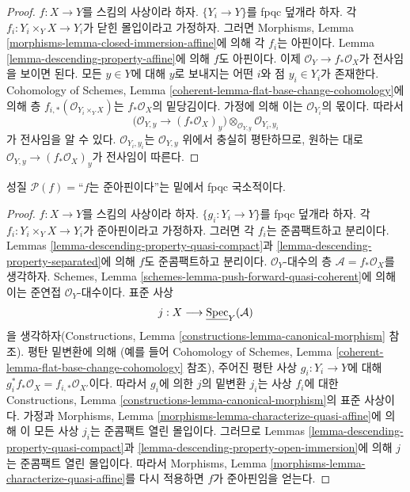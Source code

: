 \begin{proof}
$f : X \to Y$를 스킴의 사상이라 하자. $\{Y_i \to Y\}$를 fpqc
덮개라 하자. 각 $f_i : Y_i \times_Y X \to Y_i$가 닫힌 몰입이라고
가정하자. 그러면 Morphisms, Lemma
\ref{morphisms-lemma-closed-immersion-affine}에 의해 각 $f_i$는 아핀이다.
Lemma \ref{lemma-descending-property-affine}에 의해 $f$도 아핀이다. 이제
$\mathcal{O}_Y \to f_*\mathcal{O}_X$가 전사임을 보이면 된다. 모든
$y \in Y$에 대해 $y$로 보내지는 어떤 $i$와 점 $y_i \in Y_i$가 존재한다.
Cohomology of Schemes, Lemma
\ref{coherent-lemma-flat-base-change-cohomology}에 의해 층
$f_{i, *}(\mathcal{O}_{Y_i \times_Y X})$는 $f_*\mathcal{O}_X$의
밑당김이다. 가정에 의해 이는 $\mathcal{O}_{Y_i}$의 몫이다. 따라서
$$
\Big(
\mathcal{O}_{Y, y} \longrightarrow (f_*\mathcal{O}_X)_y
\Big)
\otimes_{\mathcal{O}_{Y, y}} \mathcal{O}_{Y_i, y_i}
$$
가 전사임을 알 수 있다. $\mathcal{O}_{Y_i, y_i}$는
$\mathcal{O}_{Y, y}$ 위에서 충실히 평탄하므로, 원하는 대로
$\mathcal{O}_{Y, y} \longrightarrow (f_*\mathcal{O}_X)_y$가 전사임이
따른다.
\end{proof}

\begin{lemma}
\label{lemma-descending-property-quasi-affine}
성질 $\mathcal{P}(f) =$“$f$는 준아핀이다”는 밑에서 fpqc 국소적이다.
\end{lemma}

\begin{proof}
$f : X \to Y$를 스킴의 사상이라 하자. $\{g_i : Y_i \to Y\}$를 fpqc
덮개라 하자. 각 $f_i : Y_i \times_Y X \to Y_i$가 준아핀이라고
가정하자. 그러면 각 $f_i$는 준콤팩트하고 분리이다. Lemmas
\ref{lemma-descending-property-quasi-compact}과
\ref{lemma-descending-property-separated}에 의해 $f$도 준콤팩트하고
분리이다. $\mathcal{O}_Y$-대수의 층
$\mathcal{A} = f_*\mathcal{O}_X$를 생각하자. Schemes, Lemma
\ref{schemes-lemma-push-forward-quasi-coherent}에 의해 이는 준연접
$\mathcal{O}_Y$-대수이다. 표준 사상
$$
j : X \longrightarrow \underline{\mathop{\mathrm{Spec}}}_Y(\mathcal{A})
$$
을 생각하자(Constructions, Lemma
\ref{constructions-lemma-canonical-morphism} 참조). 평탄 밑변환에 의해
(예를 들어 Cohomology of Schemes, Lemma
\ref{coherent-lemma-flat-base-change-cohomology} 참조), 주어진 평탄
사상 $g_i : Y_i \to Y$에 대해
$g_i^*f_*\mathcal{O}_X = f_{i, *}\mathcal{O}_{X'}$이다. 따라서
$g_i$에 의한 $j$의 밑변환 $j_i$는 사상 $f_i$에 대한 Constructions,
Lemma \ref{constructions-lemma-canonical-morphism}의 표준 사상이다.
가정과 Morphisms, Lemma
\ref{morphisms-lemma-characterize-quasi-affine}에 의해 이 모든 사상
$j_i$는 준콤팩트 열린 몰입이다. 그러므로 Lemmas
\ref{lemma-descending-property-quasi-compact}과
\ref{lemma-descending-property-open-immersion}에 의해 $j$는 준콤팩트
열린 몰입이다. 따라서 Morphisms, Lemma
\ref{morphisms-lemma-characterize-quasi-affine}를 다시 적용하면 $f$가
준아핀임을 얻는다.
\end{proof}

